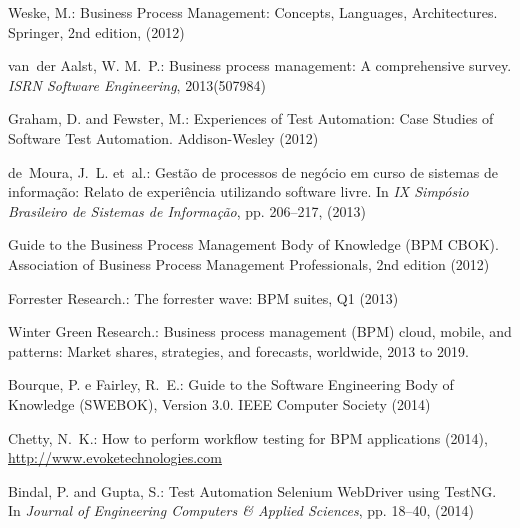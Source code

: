 \documentclass[runningheads,a4paper]{llncs}
\begin{document}
\begin{thebibliography}{4}

Weske, M.: Business Process Management: Concepts, Languages, Architectures. Springer, 2nd edition, (2012)

van~der Aalst, W. M.~P.: Business process management: A comprehensive survey. {\em ISRN Software Engineering}, 2013(507984)

Graham, D. and Fewster, M.: Experiences of Test Automation: Case Studies of Software Test Automation. Addison-Wesley (2012)

de~Moura, J.~L. et~al.: Gestão de processos de negócio em curso de sistemas de
  informação: Relato de experiência utilizando software livre. In {\em IX Simpósio Brasileiro de Sistemas de Informação}, pp.
  206--217, (2013)

 Guide to the Business Process Management Body of Knowledge (BPM
  CBOK). Association of Business Process Management Professionals, 2nd
  edition (2012)

Forrester Research.: The forrester wave: {BPM} suites, {Q1} (2013)

Winter Green Research.: Business process management (BPM) cloud, mobile, and patterns: Market shares, strategies, and forecasts, worldwide, 2013 to 2019.

Bourque, P. e Fairley, R.~E.: Guide to the Software Engineering Body of Knowledge (SWEBOK), Version 3.0. IEEE Computer Society (2014)

 Chetty, N.~K.: How to perform workflow testing for BPM applications (2014), \url{http://www.evoketechnologies.com}


Bindal, P. and Gupta, S.: Test Automation Selenium WebDriver using TestNG. In {\em Journal of Engineering Computers \& Applied Sciences}, pp.
  18--40, (2014)



\end{thebibliography}
\end{document}
